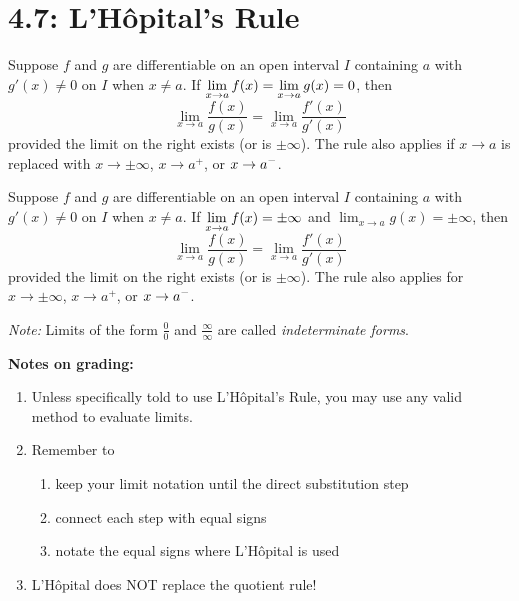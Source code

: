 \documentclass[../mathNotesPreamble]{subfiles}
\begin{document}
\section{4.7: L'H\^ opital's Rule}
\vspace*{-\baselineskip}
\begin{thmBox*}
  Suppose $f$ and $g$ are differentiable on an open interval $I$ containing $a$ with $g'(x)\neq 0$ on $I$ when $x\neq a$. If $\ds\lim_{x\to a} f(x)=\lim_{x\to a} g(x)=0$, then
    \[\lim_{x\to a}\frac{f(x)}{g(x)}=\lim_{x\to a}\frac{f'(x)}{g'(x)}\]
  provided the limit on the right exists (or is $\pm\infty$). The rule also applies if $x\to a$ is replaced with $x\to\pm\infty$, $x\to a^+$, or $x\to a\inv[]$.
\end{thmBox*}

\vspace*{-\baselineskip}
\begin{thmBox*}
  Suppose $f$ and $g$ are differentiable on an open interval $I$ containing $a$ with $g'(x)\neq 0$ on $I$ when $x\neq a$. If $\ds\lim_{x\to a} f(x)= \pm\infty$ and $\lim_{x\to a} g(x)=\pm\infty$, then
    \[\lim_{x\to a}\frac{f(x)}{g(x)}=\lim_{x\to a}\frac{f'(x)}{g'(x)}\]
  provided the limit on the right exists (or is $\pm\infty$). The rule also applies for $x\to\pm\infty$, $x\to a^+$, or $x\to a\inv[]$.
\end{thmBox*}

\textit{Note:} Limits of the form $\frac{0}{0}$ and $\frac{\infty}{\infty}$ are called \textit{indeterminate forms}.

\textbf{Notes on grading:}
\begin{enumerate}
  \item Unless specifically told to use L'H\^opital's Rule, you may use any valid method to evaluate limits.
  \item Remember to 
  \vspace*{-0.25\baselineskip}
    \begin{enumerate}
      \item keep your limit notation until the direct substitution step
      \item connect each step with equal signs
      \item notate the equal signs where L'H\^opital is used
    \end{enumerate}
  \item L'H\^opital does NOT replace the quotient rule!
\end{enumerate}
\pagebreak
\end{document}
